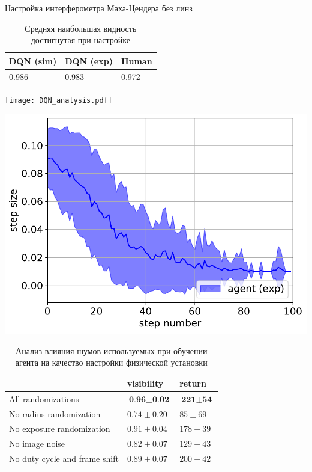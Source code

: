 \begin{frame}[allowframebreaks]{Настройка интерферометра Маха-Цендера без линз}
\begin{table} [htbp]
    \centering
    \begin{threeparttable}
        \caption*{Средняя наибольшая видность достигнутая при настройке}
        \begin{tabular}{| p{3cm} || p{3cm} || p{3cm} |}
            \hline
            \hline
            DQN (sim) & DQN (exp) & Human \\
            \hline
            0.986 & 0.983 & 0.972 \\
            \hline
            \hline
        \end{tabular}
    \end{threeparttable}
\end{table}
\framebreak
\begin{minipage}{\textwidth}
\texttt{[image: DQN\_analysis.pdf]}
\end{minipage}
\begin{minipage}{\textwidth}
\includegraphics[width=0.5\linewidth]{images/agent_step_size.pdf}
\end{minipage}

\framebreak 

\begin{table} [htbp]
    \centering
    \begin{threeparttable}
        \caption*{Анализ влияния шумов используемых при обучении агента на качество настройки физической установки}
        \begin{tabular}{| p{5cm} || p{2cm} || p{2cm} |}
            \hline
            \hline
             & visibility & return \\
            \hline
            All randomizations  & $\textbf{0.96} \pm \textbf{0.02}$ & $\textbf{221} \pm \textbf{54}$ \\
            No radius randomization & $0.74 \pm 0.20$ & $85 \pm 69$ \\
            No exposure randomization& $0.91 \pm 0.04$ & $178 \pm 39$ \\
            No image noise & $0.82 \pm 0.07$ & $129 \pm 43$ \\
            No duty cycle and frame shift  &  $0.89 \pm 0.07$ & $200 \pm 42$ \\
            \hline
            \hline
        \end{tabular}
    \end{threeparttable}
\end{table}
\end{frame}

